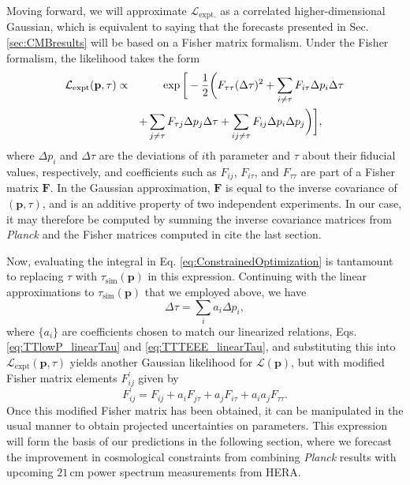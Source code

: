 \documentclass[twocolumn,aps,prd,nofootinbib,showpacs]{revtex4-1}
\begin{document}
Moving forward, we will approximate $\mathcal{L}_\textrm{expt.}$ as a correlated higher-dimensional Gaussian, which is equivalent to saying that the forecasts presented in Sec. \ref{sec:CMBresults} will be based on a Fisher matrix formalism. Under the Fisher formalism, the likelihood takes the form
\begin{eqnarray}
\mathcal{L}_\textrm{expt} ( \mathbf{p}, \tau) \propto &&\,\, \exp \bigg{[}-\frac{1}{2} \bigg{(}F_{\tau \tau} (\Delta \tau)^2  + \sum_{i \neq \tau} F_{i \tau} \Delta p_i \Delta \tau \nonumber \\
&& + \sum_{j \neq \tau} F_{\tau j} \Delta p_j \Delta \tau  + \sum_{ij \neq \tau}F_{ij} \Delta p_i \Delta p_j \bigg{ )}\bigg{]}, \qquad
\end{eqnarray}
where $\Delta p_i$ and $ \Delta \tau$ are the deviations of $i$th parameter and $\tau$ about their fiducial values, respectively, and coefficients such as $F_{ij}$, $F_{i\tau}$, and $F_{\tau \tau}$ are part of a Fisher matrix $\mathbf{F}$. In the Gaussian approximation, $\mathbf{F}$ is equal to the inverse covariance of $( \mathbf{p},  \tau)$, and is an additive property of two independent experiments. In our case, it may therefore be computed by summing the inverse covariance matrices from \emph{Planck} and the Fisher matrices computed in \acl{cite the last section}.

Now, evaluating the integral in Eq. \eqref{eq:ConstrainedOptimization} is tantamount to replacing $\tau$ with $\tau_\textrm{sim} (\mathbf{p})$ in this expression. Continuing with the linear approximations to $\tau_\textrm{sim} (\mathbf{p})$ that we employed above, we have
\begin{equation}
\Delta \tau = \sum_i a_i \Delta p_i,
\end{equation}
where $\{a_i \}$ are coefficients chosen to match our linearized relations, Eqs. \eqref{eq:TTlowP_linearTau} and \eqref{eq:TTTEEE_linearTau}, and substituting this into $\mathcal{L}_\textrm{expt} ( \mathbf{p}, \tau)$ yields another Gaussian likelihood for $\mathcal{L} (\mathbf{p})$, but with modified Fisher matrix elements $F^\prime_{ij}$ given by
\begin{equation}
\label{eq:newFisher}
F^\prime_{ij} = F_{ij} + a_i F_{j \tau} + a_j F_{i \tau} + a_i a_j F_{\tau \tau}.
\end{equation}
Once this modified Fisher matrix has been obtained, it can be manipulated in the usual manner to obtain projected uncertainties on parameters. This expression will form the basis of our predictions in the following section, where we forecast the improvement in cosmological constraints from combining \emph{Planck} results with upcoming $21\,\textrm{cm}$ power spectrum measurements from HERA.
\end{document}
